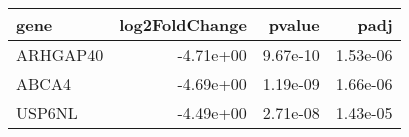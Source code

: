 \begin{tabular}{lrrr}
\toprule
    gene &  log2FoldChange &   pvalue &     padj \\
\midrule
ARHGAP40 &       -4.71e+00 & 9.67e-10 & 1.53e-06 \\
   ABCA4 &       -4.69e+00 & 1.19e-09 & 1.66e-06 \\
  USP6NL &       -4.49e+00 & 2.71e-08 & 1.43e-05 \\
\bottomrule
\end{tabular}
